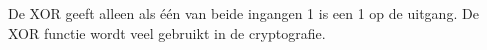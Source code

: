 De XOR geeft alleen als \'e\'en van beide ingangen 1 is een 1 op de uitgang. De XOR functie wordt veel gebruikt in de cryptografie.

